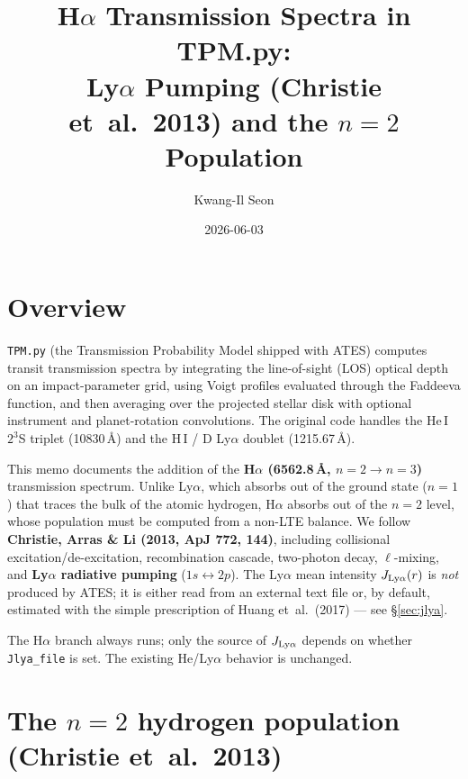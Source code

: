 \documentclass[english,a4paper]{kiseon_memo}
\begin{document}
\title{H$\alpha$ Transmission Spectra in TPM.py:\\
Ly$\alpha$ Pumping (Christie et~al.~2013) and the $n=2$ Population}
\author{Kwang-Il Seon}
\date{2026-06-03}
\maketitle

\tableofcontents
\bigskip

\section{Overview}

\texttt{TPM.py} (the Transmission Probability Model shipped with ATES)
computes transit transmission spectra by integrating the line-of-sight
(LOS) optical depth on an impact-parameter grid, using Voigt profiles
evaluated through the Faddeeva function, and then averaging over the
projected stellar disk with optional instrument and planet-rotation
convolutions. The original code handles the He\,I\,$2^3$S triplet
(10830\,\AA{}) and the H\,I / D Ly$\alpha$ doublet (1215.67\,\AA{}).

This memo documents the addition of the \textbf{H$\alpha$
(6562.8\,\AA{}, $n=2\to n=3$)} transmission spectrum. Unlike Ly$\alpha$,
which absorbs out of the ground state ($n=1$) that traces the bulk of
the atomic hydrogen, H$\alpha$ absorbs out of the $n=2$ level, whose
population must be computed from a non-LTE balance. We follow
\textbf{Christie, Arras \& Li (2013, ApJ 772, 144)}, including
collisional excitation/de-excitation, recombination cascade, two-photon
decay, $\ell$-mixing, and \textbf{Ly$\alpha$ radiative pumping}
($1s\leftrightarrow2p$). The Ly$\alpha$ mean intensity $J_{\rm Ly\alpha}(r)$
is \emph{not} produced by ATES; it is either read from an external text
file or, by default, estimated with the simple prescription of Huang
et~al.~(2017) --- see \S\ref{sec:jlya}.

The H$\alpha$ branch always runs; only the source of $J_{\rm Ly\alpha}$
depends on whether \texttt{Jlya\_file} is set. The existing He/Ly$\alpha$
behavior is unchanged.

\section{The $n=2$ hydrogen population (Christie et~al.~2013)}
\end{document}
